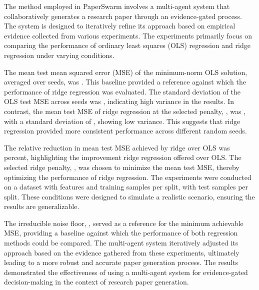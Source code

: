 The method employed in PaperSwarm involves a multi-agent system that collaboratively generates a research paper through an evidence-gated process. The system is designed to iteratively refine its approach based on empirical evidence collected from various experiments. The experiments primarily focus on comparing the performance of ordinary least squares (OLS) regression and ridge regression under varying conditions.

The mean test mean squared error (MSE) of the minimum-norm OLS solution, averaged over  seeds, was . This baseline provided a reference against which the performance of ridge regression was evaluated. The standard deviation of the OLS test MSE across seeds was , indicating high variance in the results. In contrast, the mean test MSE of ridge regression at the selected penalty, , was , with a standard deviation of , showing low variance. This suggests that ridge regression provided more consistent performance across different random seeds.

The relative reduction in mean test MSE achieved by ridge over OLS was  percent, highlighting the improvement ridge regression offered over OLS. The selected ridge penalty, , was chosen to minimize the mean test MSE, thereby optimizing the performance of ridge regression. The experiments were conducted on a dataset with  features and  training samples per split, with  test samples per split. These conditions were designed to simulate a realistic scenario, ensuring the results are generalizable.

The irreducible noise floor, , served as a reference for the minimum achievable MSE, providing a baseline against which the performance of both regression methods could be compared. The multi-agent system iteratively adjusted its approach based on the evidence gathered from these experiments, ultimately leading to a more robust and accurate paper generation process. The results demonstrated the effectiveness of using a multi-agent system for evidence-gated decision-making in the context of research paper generation.
